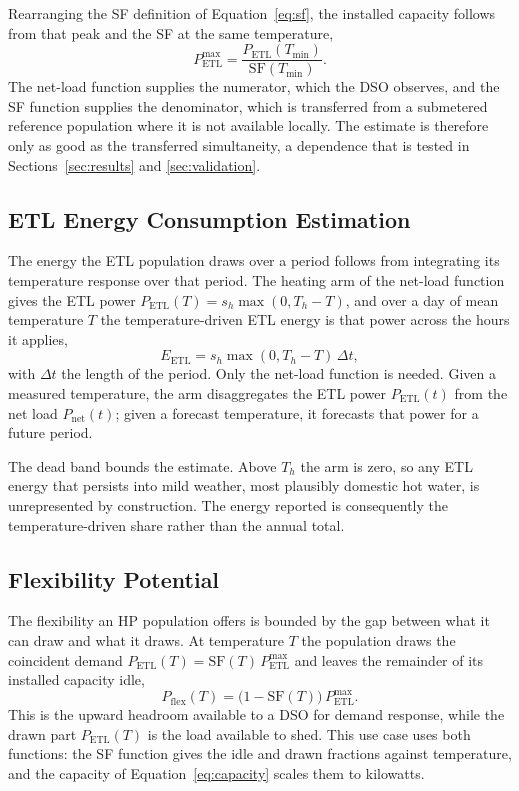 \documentclass[9pt,journal,a4]{IEEEtran}
\begin{document}
Rearranging the SF definition of Equation~\eqref{eq:sf}, the installed capacity follows from that peak and the SF at the same temperature,
\begin{equation}
P_{\mathrm{ETL}}^{\max} = \frac{P_{\mathrm{ETL}}(T_{\min})}{\mathrm{SF}(T_{\min})}.
\label{eq:capacity}
\end{equation}
The net-load function supplies the numerator, which the DSO observes, and the SF function supplies the denominator, which is transferred from a submetered reference population where it is not available locally. The estimate is therefore only as good as the transferred simultaneity, a dependence that is tested in Sections~\ref{sec:results} and \ref{sec:validation}.


\subsection{ETL Energy Consumption Estimation}
\label{sec:uc-energy}

The energy the ETL population draws over a period follows from integrating its temperature response over that period. The heating arm of the net-load function gives the ETL power $P_{\mathrm{ETL}}(T) = s_h \max(0, T_h - T)$, and over a day of mean temperature $T$ the temperature-driven ETL energy is that power across the hours it applies,
\begin{equation}
E_{\mathrm{ETL}} = s_h \max(0, T_h - T)\,\Delta t,
\label{eq:energy}
\end{equation}
with $\Delta t$ the length of the period. Only the net-load function is needed. Given a measured temperature, the arm disaggregates the ETL power $P_{\mathrm{ETL}}(t)$ from the net load $P_{\mathrm{net}}(t)$; given a forecast temperature, it forecasts that power for a future period.

The dead band bounds the estimate. Above $T_h$ the arm is zero, so any ETL energy that persists into mild weather, most plausibly domestic hot water, is unrepresented by construction. The energy reported is consequently the temperature-driven share rather than the annual total.


\subsection{Flexibility Potential}
\label{sec:uc-flex}

The flexibility an HP population offers is bounded by the gap between what it can draw and what it draws. At temperature $T$ the population draws the coincident demand $P_{\mathrm{ETL}}(T) = \mathrm{SF}(T)\,P_{\mathrm{ETL}}^{\max}$ and leaves the remainder of its installed capacity idle,
\begin{equation}
P_{\mathrm{flex}}(T) = \big(1 - \mathrm{SF}(T)\big)\,P_{\mathrm{ETL}}^{\max}.
\label{eq:flex}
\end{equation}
This is the upward headroom available to a DSO for demand response, while the drawn part $P_{\mathrm{ETL}}(T)$ is the load available to shed. This use case uses both functions: the SF function gives the idle and drawn fractions against temperature, and the capacity of Equation~\eqref{eq:capacity} scales them to kilowatts.
\end{document}
